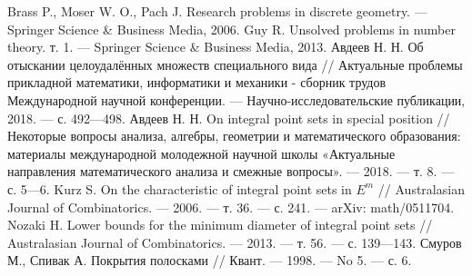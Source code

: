 \begin{thebibliography}{99}
Brass P., Moser W. O., Pach J. Research problems in discrete geometry. — Springer Science
\& Business Media, 2006.
Guy R. Unsolved problems in number theory. т. 1. — Springer Science \& Business Media,
2013.
Авдеев Н. Н. Об отыскании целоудалённых множеств специального вида // Актуальные
проблемы прикладной математики, информатики и механики - сборник трудов Международной
научной конференции. — Научно-исследовательские публикации, 2018. — с. 492—498.
Авдеев Н. Н. On integral point sets in special position // Некоторые вопросы анализа,
алгебры, геометрии и математического образования: материалы международной молодежной
научной школы «Актуальные направления математического анализа и смежные вопросы». —
2018. — т. 8. — с. 5—6.
Kurz S. On the characteristic of integral point sets in $E^m$ // Australasian Journal of
Combinatorics. — 2006. — т. 36. — с. 241. — arXiv: math/0511704.
Nozaki H. Lower bounds for the minimum diameter of integral point sets // Australasian
Journal of Combinatorics. — 2013. — т. 56. — с. 139—143.
Смуров М., Спивак А. Покрытия полосками // Квант. — 1998. — No 5. — с. 6.
\end{thebibliography}
